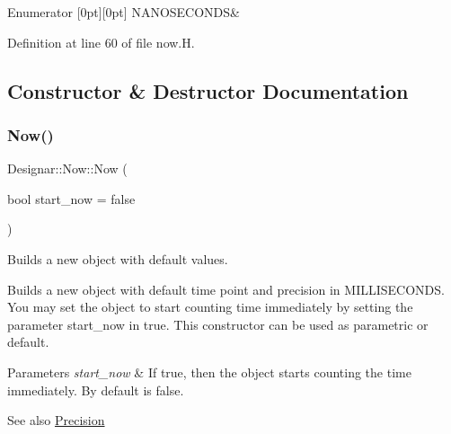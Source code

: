 \begin{DoxyEnumFields}{Enumerator}
[0pt][0pt]{}\mbox{\label{class_designar_1_1_now_a3c9f5e57907c88cbe63c70a64638c072a5b3b43ddfdecac6712fd1dbc20798e6b}} 
N\+A\+N\+O\+S\+E\+C\+O\+N\+DS&\\
\hline

\end{DoxyEnumFields}


Definition at line 60 of file now.\+H.



\subsection{Constructor \& Destructor Documentation}
\mbox{\label{class_designar_1_1_now_ad96b225953507a5a7853aef2c6b30641}} 
\subsubsection{\texorpdfstring{Now()}{Now()}\hspace{0.1cm}{\footnotesize\ttfamily [1/2]}}
{\footnotesize\ttfamily Designar\+::\+Now\+::\+Now (\begin{DoxyParamCaption}\item[{bool}]{start\+\_\+now = {\ttfamily false} }\end{DoxyParamCaption})\hspace{0.3cm}{\ttfamily [inline]}}



Builds a new object with default values. 

Builds a new object with default time point and precision in M\+I\+L\+L\+I\+S\+E\+C\+O\+N\+DS. You may set the object to start counting time immediately by setting the parameter start\+\_\+now in true. This constructor can be used as parametric or default.


\begin{DoxyParams}{Parameters}
{\em start\+\_\+now} & If true, then the object starts counting the time immediately. By default is false.\\
\hline
\end{DoxyParams}
\begin{DoxySeeAlso}{See also}
\hyperlink{class_designar_1_1_now_a3c9f5e57907c88cbe63c70a64638c072}{Precision} 
\end{DoxySeeAlso}


